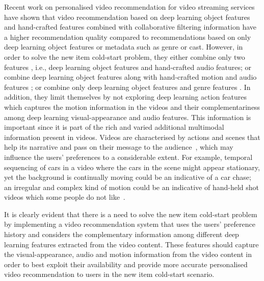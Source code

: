 \documentclass[review]{elsarticle}
\begin{document}
Recent work on personalised video recommendation for video streaming services \citep{deldjoo2019movie,du2018personalized} have shown that video recommendation based on deep learning object features and hand-crafted features combined with collaborative filtering information have a higher recommendation quality compared to recommendations based on only deep learning object features or metadata such as genre or cast. However, in order to solve the new item cold-start problem, they either combine only two features \citep{deldjoo2019movie}, i.e., deep learning object features and hand-crafted audio features; or combine deep learning object features along with hand-crafted motion and audio features \citep{du2018personalized}; or combine only deep learning object features and genre features \citep{ma2018lga}. In addition, they limit themselves by not exploring deep learning action features which captures the motion information in the videos and their complementariness among deep learning visual-appearance and audio features. This information is important since it is part of the rich and varied additional multimodal information present in videos. Videos are characterised by actions and scenes that help its narrative and pass on their message to the audience~\citep{carreira2017quo,huang2018makes,stroud2018d3d,adeli2019component,wehrmann2017movie}, which may influence the users' preferences to a considerable extent. For example, temporal sequencing of cars in a video where the cars in the scene might appear stationary, yet the background is continually moving could be an indicative of a car chase; an irregular and complex kind of motion could be an indicative of hand-held shot videos which some people do not like~\citep{alvarez2019influence}. 



It is clearly evident that there is a need to solve the new item cold-start problem by implementing a video recommendation system that uses the users' preference history and considers the complementary information among different deep learning features extracted from the video content. These features should capture the visual-appearance, audio and motion information from the video content in order to best exploit their availability and provide more accurate personalised video recommendation to users in the new item cold-start scenario. 
\end{document}

